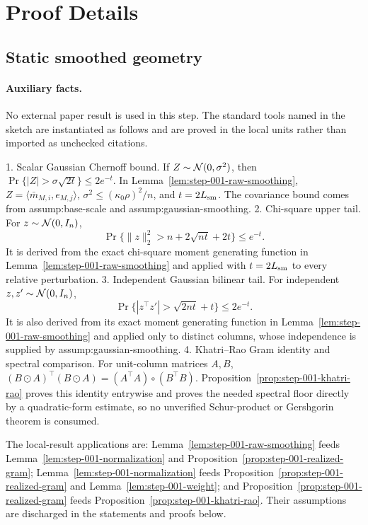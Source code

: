\appendix

\section{Proof Details}\label{sec:proof-details}

\subsection{Static smoothed geometry}\label{app:step-001}

\paragraph{Auxiliary facts.}

No external paper result is used in this step. The standard tools named in the
sketch are instantiated as follows and are proved in the local units rather
than imported as unchecked citations.

1. Scalar Gaussian Chernoff bound. If $Z\sim {\cal N}(0,\sigma^2)$,
   then
   $\Pr\{|Z|>\sigma\sqrt{2t}\}\le2e^{-t}$.
   In Lemma~\ref{lem:step-001-raw-smoothing},
   $Z=\langle \bar m_{M,i},e_{M,j}\rangle$,
   $\sigma^2\le(\kappa _0\rho)^2/n$, and $t=2L_{\rm sm}$.
   The covariance bound comes from assump:base-scale and
   assump:gaussian-smoothing.
2. Chi-square upper tail. For $z\sim {\cal N}(0,I_n)$,
   \[
   \Pr\{\|z\|_2^2>n+2\sqrt{nt}+2t\}\le e^{-t}.
   \]
   It is derived from the exact chi-square moment generating function in
   Lemma~\ref{lem:step-001-raw-smoothing} and applied with
   $t=2L_{\rm sm}$ to every relative perturbation.
3. Independent Gaussian bilinear tail. For independent
   $z,z'\sim {\cal N}(0,I_n)$,
   \[
   \Pr\{|z^\top z'|>\sqrt{2nt}+t\}\le2e^{-t}.
   \]
   It is also derived from its exact moment generating function in
   Lemma~\ref{lem:step-001-raw-smoothing} and applied only to distinct
   columns, whose independence is supplied by
   assump:gaussian-smoothing.
4. Khatri--Rao Gram identity and spectral comparison. For unit-column
   matrices $A,B$,
   $(B\odot A)^\top(B\odot A)=(A^\top A)\circ(B^\top B)$.
   Proposition~\ref{prop:step-001-khatri-rao} proves this identity
   entrywise and proves the needed spectral floor directly by a quadratic-form
   estimate, so no unverified Schur-product or Gershgorin theorem is consumed.

The local-result applications are: Lemma~\ref{lem:step-001-raw-smoothing}
feeds Lemma~\ref{lem:step-001-normalization} and
Proposition~\ref{prop:step-001-realized-gram};
Lemma~\ref{lem:step-001-normalization} feeds
Proposition~\ref{prop:step-001-realized-gram} and
Lemma~\ref{lem:step-001-weight}; and
Proposition~\ref{prop:step-001-realized-gram} feeds
Proposition~\ref{prop:step-001-khatri-rao}. Their assumptions are
discharged in the statements and proofs below.

